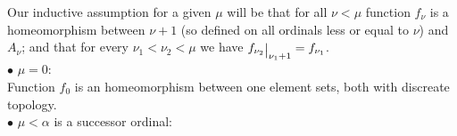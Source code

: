 Our inductive assumption for a given $\mu$ will be that 
for all $\nu < \mu$ function $f_\nu$ is a
homeomorphism 
between $\nu + 1$ (so defined on all ordinals less 
or equal to $\nu$) 
and $A_\nu$; and that for every $\nu_1 < \nu_2 < \mu$ we have 
$f_{\nu_2}\raisebox{-0.5\depth}{\big|}_{\nu_1 + 1} = f_{\nu_1}$.
\\[8pt]
$\bullet$ $\mu = 0$: \\
Function $f_0$ is an homeomorphism between one element sets, both with discreate topology. \\[8pt]
$\bullet$ $\mu < \alpha$ is a successor ordinal:\\ 
